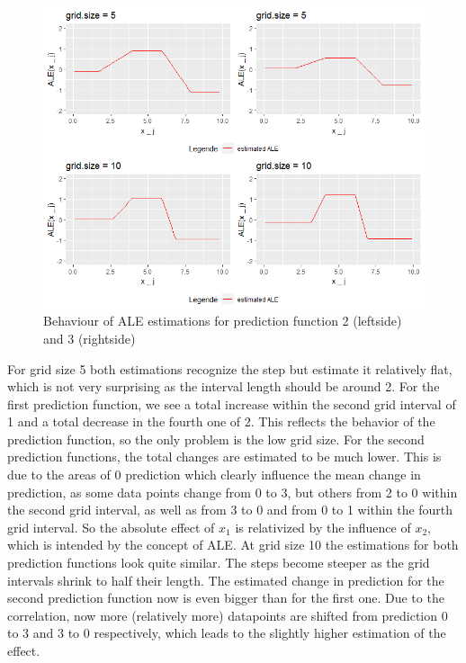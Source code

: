 \documentclass[]{krantz}
\begin{document}
\begin{figure}
\includegraphics[width=1\linewidth]{images/ALE_2_pwc_example5_gs5_10_} \caption{Behaviour of ALE estimations for prediction
function 2 (leftside) and 3 (rightside)}\label{fig:pwcexample5gs510}
\end{figure}




For grid size 5 both estimations recognize the step but estimate it
relatively flat, which is not very surprising as the interval length
should be around 2. For the first prediction function, we see a total
increase within the second grid interval of 1 and a total decrease in
the fourth one of 2. This reflects the behavior of the prediction
function, so the only problem is the low grid size. For the second
prediction functions, the total changes are estimated to be much lower.
This is due to the areas of 0 prediction which clearly influence the
mean change in prediction, as some data points change from 0 to 3, but
others from 2 to 0 within the second grid interval, as well as from 3 to
0 and from 0 to 1 within the fourth grid interval. So the absolute
effect of \(x_1\) is relativized by the influence of \(x_2\), which is
intended by the concept of ALE. At grid size 10 the estimations for both
prediction functions look quite similar. The steps become steeper as the
grid intervals shrink to half their length. The estimated change in
prediction for the second prediction function now is even bigger than
for the first one. Due to the correlation, now more (relatively more)
datapoints are shifted from prediction 0 to 3 and 3 to 0 respectively,
which leads to the slightly higher estimation of the effect.
\end{document}
